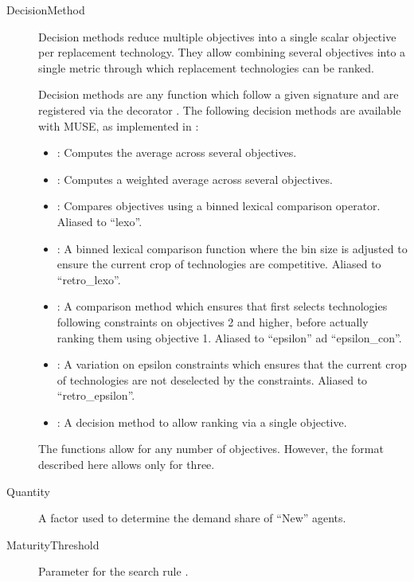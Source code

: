 \documentclass[letterpaper,10pt,english]{sphinxmanual}
\begin{document}
\label{\detokenize{inputs/agents:decisionmethod}}\begin{description}
\item[{DecisionMethod}] \leavevmode
Decision methods reduce multiple objectives into a single scalar objective per
replacement technology. They allow combining several objectives into a single metric
through which replacement technologies can be ranked.

Decision methods are any function which follow a given signature and are registered
via the decorator . The following
decision methods are available with MUSE, as implemented in
:
\begin{itemize}
\item {} 
: Computes the average across several objectives.

\item {} 
: Computes a weighted average across several
objectives.

\item {} 
: Compares objectives using a
binned lexical comparison operator. Aliased to “lexo”.

\item {} 
: A binned lexical
comparison function where the bin size is adjusted to ensure the current crop of
technologies are competitive. Aliased to “retro\_lexo”.

\item {} 
: A comparison method which
ensures that first selects technologies following constraints on objectives 2 and
higher, before actually ranking them using objective 1. Aliased to “epsilon” ad
“epsilon\_con”.

\item {} 
: A variation on
epsilon constraints which ensures that the current crop of technologies are not
deselected by the constraints. Aliased to “retro\_epsilon”.

\item {} 
: A decision method to allow
ranking via a single objective.

\end{itemize}

The functions allow for any number of objectives. However, the format described here
allows only for three.

\item[{Quantity}] \leavevmode
A factor used to determine the demand share of “New” agents.

\item[{MaturityThreshold}] \leavevmode
Parameter for the search rule .

\end{description}
\end{document}
